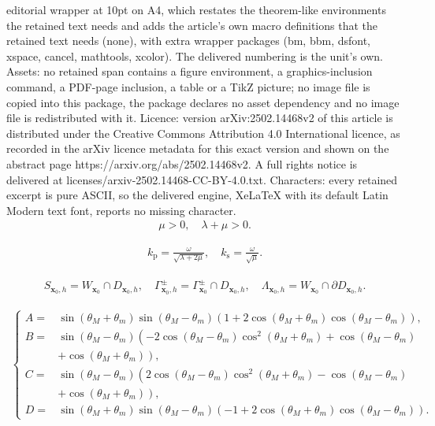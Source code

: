 \documentclass[10pt,a4paper]{amsart}
\begin{document}
editorial wrapper at 10pt on A4, which restates the theorem-like environments the retained text needs and adds the article's own macro definitions that the retained text needs (none), with extra wrapper packages (bm, bbm, dsfont, xspace, cancel, mathtools, xcolor). The delivered numbering is the unit's own. Assets: no retained span contains a figure environment, a graphics-inclusion command, a PDF-page inclusion, a table or a TikZ picture; no image file is copied into this package, the package declares no asset dependency and no image file is redistributed with it. Licence: version arXiv:2502.14468v2 of this article is distributed under the Creative Commons Attribution 4.0 International licence, as recorded in the arXiv licence metadata for this exact version and shown on the abstract page https://arxiv.org/abs/2502.14468v2. A full rights notice is delivered at licenses/arxiv-2502.14468-CC-BY-4.0.txt. Characters: every retained excerpt is pure ASCII, so the delivered engine, XeLaTeX with its default Latin Modern text font, reports no missing character.
\begin{align} \label{ineq_introduction_strong_convexity_condition}
	\mu > 0, \quad \lambda + \mu > 0.
\end{align}

\begin{align} \label{eq_introduction_kpks} 
	k_{\mathrm{p}} = \frac{\omega}{\sqrt{\lambda + 2\mu}}, \quad k_{\mathrm{s}} = \frac{\omega}{\sqrt{\mu}}.
\end{align}

\begin{align} \label{def_inverse_problem_local_sector_Sh_Gammah_Lambdah}
	S_{\mathbf{x}_0,h} = W_{\mathbf{x}_0} \cap D_{\mathbf{x}_0,h}, \quad \Gamma_{\mathbf{x}_0,h}^\pm = \Gamma^\pm_{\mathbf{x}_0} \cap D_{\mathbf{x}_0,h}, \quad \Lambda_{\mathbf{x}_0,h} = W_{\mathbf{x}_0} \cap \partial D_{\mathbf{x}_0,h} .
\end{align}  

	\begin{align} \label{def_thm_2_ABCD}
		\begin{cases}
			A=&\sin\left(\theta_M+\theta_m\right)\sin\left(\theta_M-\theta_m\right)\left(1+2\cos\left(\theta_M+\theta_m\right)\cos\left(\theta_M-\theta_m\right)\right), \\
			B=&\sin\left(\theta_M-\theta_m\right)\left(-2\cos\left(\theta_M-\theta_m\right)\cos^2\left(\theta_M+\theta_m\right)+\cos\left(\theta_M-\theta_m\right)\right. \\
			&\left.+\cos\left(\theta_M+\theta_m\right)\right), \\
			C=&\sin\left(\theta_M-\theta_m\right)\left(2\cos\left(\theta_M-\theta_m\right)\cos^2\left(\theta_M+\theta_m\right)-\cos\left(\theta_M-\theta_m\right)\right. \\
			&\left.+\cos\left(\theta_M+\theta_m\right)\right), \\
			D=&\sin\left(\theta_M+\theta_m\right)\sin\left(\theta_M-\theta_m\right)\left(-1+2\cos\left(\theta_M+\theta_m\right)\cos\left(\theta_M-\theta_m\right)\right).
		\end{cases}
	\end{align}
\end{document}
